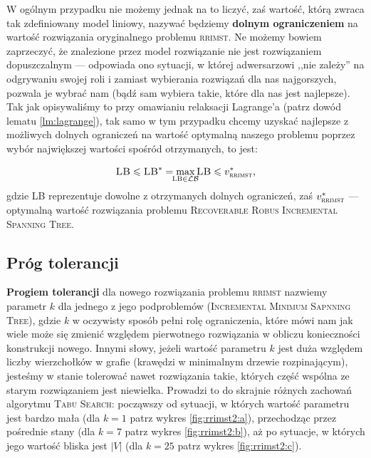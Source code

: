 W ogólnym przypadku nie możemy jednak na to liczyć, zaś wartość, którą zwraca tak zdefiniowany model liniowy, nazywać będziemy \textbf{dolnym ograniczeniem} na wartość rozwiązania oryginalnego problemu \textsc{rrimst}. Ne możemy bowiem zaprzeczyć, że znalezione przez model rozwiązanie nie jest rozwiązaniem dopuszczalnym --- odpowiada ono sytuacji, w której adwersarzowi ,,nie zależy'' na odgrywaniu swojej roli i zamiast wybierania rozwiązań dla nas najgorszych, pozwala je wybrać nam (bądź sam wybiera takie, które dla nas jest najlepsze). Tak jak opisywaliśmy to przy omawianiu relaksacji Lagrange'a (patrz dowód lematu \ref{lm:lagrange}), tak samo w tym przypadku chcemy uzyskać najlepsze z możliwych dolnych ograniczeń na wartość optymalną naszego problemu poprzez wybór największej wartości spośród otrzymanych, to jest:

\begin{equation}
\textsc{LB} \leqslant \textsc{LB}^{\ast} = \max_{\mathclap{\textsc{LB} \in \mathcal{LB}}} \textsc{LB} \leqslant v_{\textsc{rrimst}}^{\ast}\text{,}
\end{equation}
gdzie \textsc{LB} reprezentuje dowolne z otrzymanych dolnych ograniczeń, zaś $v_{\textsc{rrimst}}^{\ast}$ --- optymalną wartość rozwiązania problemu \textsc{Recoverable Robus Incremental Spanning Tree}.

\subsection{Próg tolerancji}

\textbf{Progiem tolerancji} dla nowego rozwiązania problemu \textsc{rrimst} nazwiemy parametr $k$ dla jednego z jego podproblemów (\textsc{Incremental Minimum Sapnning Tree}), gdzie $k$ w oczywisty sposób pełni rolę ograniczenia, które mówi nam jak wiele może się zmienić względem pierwotnego rozwiązania w obliczu konieczności konstrukcji nowego. Innymi słowy, jeżeli wartość parametru $k$ jest duża względem liczby wierzchołków w grafie (krawędzi w minimalnym drzewie rozpinającym), jesteśmy w stanie tolerować nawet rozwiązania takie, których część wspólna ze starym rozwiązaniem jest niewielka. Prowadzi to do skrajnie różnych zachowań algorytmu \textsc{Tabu Search}: począwszy od sytuacji, w których wartość parametru jest bardzo mała (dla $k = 1$ patrz wykres \ref{fig:rrimst2:a}), przechodząc przez pośrednie stany (dla $k = 7$ patrz wykres \ref{fig:rrimst2:b}), aż po sytuacje, w których jego wartość bliska jest $\left| V \right|$ (dla $k = 25$ patrz wykres \ref{fig:rrimst2:c}).

